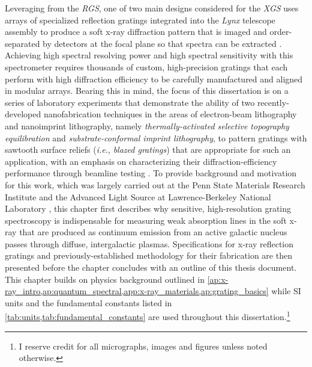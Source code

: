 Leveraging from the \emph{RGS}, one of two main designs considered for the \emph{XGS} uses arrays of specialized reflection gratings integrated into the \emph{Lynx} telescope assembly to produce a soft x-ray diffraction pattern that is imaged and order-separated by detectors at the focal plane so that spectra can be extracted \cite{McEntaffer19}. 
Achieving high spectral resolving power and high spectral sensitivity with this spectrometer requires thousands of custom, high-precision gratings that each perform with high diffraction efficiency to be carefully manufactured and aligned in modular arrays. %
Bearing this in mind, the focus of this dissertation is on a series of laboratory experiments that demonstrate the ability of two recently-developed nanofabrication techniques in the areas of electron-beam lithography and nanoimprint lithography, namely \emph{thermally-activated selective topography equilibration} and \emph{substrate-conformal imprint lithography}, to pattern gratings with sawtooth surface reliefs (\emph{i.e.}, \emph{blazed gratings}) that are appropriate for such an application, with an emphasis on characterizing their diffraction-efficiency performance through beamline testing \cite{McCoy16,McCoy17,McCoy18,McCoy20,McCoy20b}. 
To provide background and motivation for this work, which was largely carried out at the Penn State Materials Research Institute \cite{PSU_MRI} and the Advanced Light Source at Lawrence-Berkeley National Laboratory \cite{ALS_web,LBNL_web}, this chapter first describes why sensitive, high-resolution grating spectroscopy is indispensable for measuring weak absorption lines in the soft x-ray that are produced as continuum emission from an active galactic nucleus passes through diffuse, intergalactic plasmas.  %
Specifications for x-ray reflection gratings and previously-established methodology for their fabrication are then presented before the chapter concludes with an outline of this thesis document. %
This chapter builds on physics background outlined in \cref{ap:x-ray_intro,ap:quantum_spectral,app:x-ray_materials,ap:grating_basics} while SI units and the fundamental constants listed in \cref{tab:units,tab:fundamental_constants} are used throughout this dissertation.\footnote{I reserve credit for all micrographs, images and figures unless noted otherwise.} 

